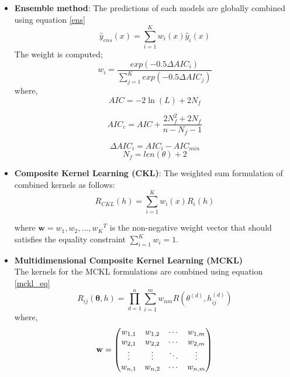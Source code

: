 \documentclass[11pt, letterpaper]{article}
\begin{document}
\begin{itemize}

\item \textbf{Ensemble method}: The predictions of each models are globally combined using equation \ref{ens}
	\begin{equation}
	\label{ens}
		\hat{y}_{ens}(x) = \sum_{i=1}^{K}w_i(x)\hat{y}_i(x)
	\end{equation}
The weight is computed; 
	\begin{equation}
		w_i = \frac{exp(-0.5\Delta AIC_i)}{\sum_{j=1}^{K}exp(-0.5\Delta AIC_j)}
	\end{equation}
where,
	\begin{equation}
		AIC = -2\ln(L) + 2N_f
	\end{equation}

	\begin{equation}
		AIC_c = AIC + \frac{2N_f^2 + 2N_f}{n - N_f-1}
	\end{equation}
	
	\begin{equation}
		\Delta AIC_i = AIC_i - AIC_{min}
	\end{equation}
	\begin{equation}
		N_f = len(\theta) + 2
	\end{equation}
	
    \item \textbf{Composite Kernel Learning (CKL)}: The weighted sum formulation of combined kernels as follows:
\begin{equation}
R_{CKL}(h) = \sum_{i=1}^{K}w_i(x)R_i(h)
\end{equation}

where $\textbf{w} = {w_1,w_2,...,w_K}^T $ is the non-negative weight vector that should satisfies the equality constraint $\sum_{i=1}^K w_i = 1$.

\item \textbf{Multidimensional Composite Kernel Learning (MCKL)}\\
The kernels for the MCKL formulations are combined using equation \ref{mckl_eq}
\begin{equation}
\label{mckl_eq}
    R_{ij}(\boldsymbol{\theta},h) = \prod\limits_{d=1}^{n}\sum_{i=1}^{m}w_{nm}R\left(\theta^{(d)},h_{ij}^{(d)}\right)
\end{equation}
where, \\
\begin{align*}\vb{w} = 
\mqty(
w_{1,1} & w_{1,2} & \cdots & w_{1,m} \\
w_{2,1} & w_{2,2} & \cdots & w_{2,m} \\
\vdots  & \vdots  & \ddots & \vdots  \\
w_{n,1} & w_{n,2} & \cdots & w_{n,m} )
\end{align*}
\end{itemize}
\end{document}
